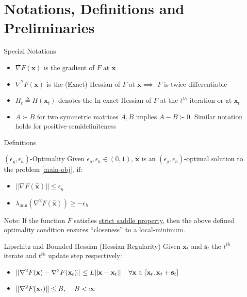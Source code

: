 \documentclass{beamer}
\newcommand{\h}{\nabla^{2}}
\newcommand{\g}{\nabla}
\newcommand{\xbold}{\mathbf{x}}
\newcommand{\sbold}{\mathbf{s}}
\newcommand{\mineig}{\lambda_{\min}}
\begin{document}
\section{Notations, Definitions and Preliminaries}
\begin{frame}{Special Notations}
\begin{itemize}
\item<1->{\(\g F(\xbold)\) is the gradient of \(F\) at \(\xbold\)}
\item<2->{\(\h F(\xbold)\) is the (Exact) Hessian of \(F\) at \(\xbold \implies\) \(F\) is twice-differentiable}
\item<3->{\(H_{t} \triangleq H(\xbold_{t})\) denotes the In-exact Hessian of \(F\) at the \(t^{th}\) iteration or at \(\xbold_{t}\)}
\item<4->{\(A \succ B\) for two symmetric matrices \(A, B\) implies \(A - B \succ 0\). Similar notation holds for positive-semidefiniteness}
\end{itemize}
\end{frame}

\begin{frame}{Definitions}
\begin{alertblock}{\((\epsilon_{g}, \epsilon_{h})\)-Optimality}
\label{sec-opt}
Given \(\epsilon_{g}, \epsilon_{h} \in (0, 1)\), \(\mathbf{\hat{x}}\) is an \((\epsilon_{g}, \epsilon_{h})\)-optimal solution to the problem \ref{main-obj}, if:
\begin{itemize}
\item \(||\g F(\mathbf{\hat{x}}) || \leq \epsilon_{g}\)
\item \(\mineig (\h F(\mathbf{\hat{x}})) \geq -\epsilon_{h}\)
\end{itemize}
\end{alertblock}
\pause
Note: If the function \(F\) satisfies \underline{strict saddle property}, then the above defined optimality condition ensures ``closeness'' to a local-minimum. %
\pause
\begin{alertblock}{Lipschitz and Bounded Hessian (Hessian Regularity)}
Given \(\xbold_{t}\) and \(\sbold_{t}\) the \(t^{th}\) iterate and \(t^{th}\) update step respectively:
\begin{itemize}
\item \(||\h F(\xbold) - \h F(\xbold_{t})|| \leq L||\xbold - \xbold_{t}|| \hspace{4mm} \forall \xbold \in [\xbold_{t}, \xbold_{t} + \sbold_{t}]\)
\item \(||\h F(\xbold_{t}) || \leq B, \hspace{4mm} B < \infty\)
\end{itemize}
\end{alertblock}
\end{frame}
\end{document}
